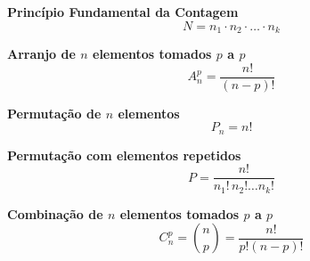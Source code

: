 \documentclass[preview,10pt]{standalone}
\begin{document}
\textbf{Princípio Fundamental da Contagem}  
\[
N = n_1 \cdot n_2 \cdot \dots \cdot n_k
\]

\vspace{0.2cm}

\textbf{Arranjo de $n$ elementos tomados $p$ a $p$}  
\[
A_n^p = \frac{n!}{(n-p)!}
\]

\vspace{0.2cm}

\textbf{Permutação de $n$ elementos}  
\[
P_n = n!
\]

\vspace{0.2cm}

\textbf{Permutação com elementos repetidos}  
\[
P = \frac{n!}{n_1! \, n_2! \dots n_k!}
\]

\vspace{0.2cm}

\textbf{Combinação de $n$ elementos tomados $p$ a $p$}  
\[
C_n^p = \binom{n}{p} = \frac{n!}{p!(n-p)!}
\]
\end{document}
